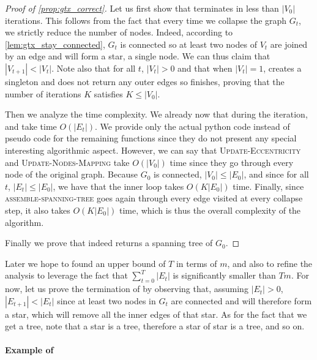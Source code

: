\begin{proof}[Proof of \autoref{prop:gtx_correct}]
  Let us first show that \gtx{} terminates in less than $|V_0|$ iterations. This follows from the
  fact that every time we collapse the graph $G_t$, we strictly reduce the number of nodes. Indeed,
  according to \autoref{lem:gtx_stay_connected}, $G_t$ is connected so at least two nodes of $V_t$
  are joined by an edge and will form a star, \ie{} a single node. We can thus claim that $|V_{t+1}| <
  |V_t|$. Note also that for all $t$, $|V_t| > 0$ and that when $|V_t|=1$, \extractStar{} creates a
  singleton and \collapseStar{} does not return any outer edges so \gtx{} finishes, proving that the
  number of iterations $K$ satisfies $K \leq |V_0|$.

 Then we analyze the time complexity. We already now that during the \tth{} iteration,
 \extractStar{} and \collapseStar{} take time $O(|E_t|)$. We provide only the actual python code
 instead of pseudo code for the remaining functions since they do not present any special
 interesting algorithmic aspect. However, we can say that \textsc{Update-Eccentricity} and
 \textsc{Update-Nodes-Mapping} take $O(|V_0|)$ time since they go through every node of the original
 graph. Because $G_0$ is connected, $|V_0| \leq |E_0|$, and since for all $t$, $|E_t| \leq |E_0|$,
 we have that the \gtx{} inner loop takes $O(K|E_0|)$ time. Finally, since
 \textsc{assemble-spanning-tree} goes again through every edge visited at every collapse step, it
 also takes $O(K|E_0|)$ time, which is thus the overall complexity of the \gtx{} algorithm.

  Finally we prove that \gtx{} indeed returns a spanning tree of $G_0$.
\end{proof}


Later we hope to found an upper bound of $T$ in terms of $m$, and also to refine the analysis to
leverage the fact that $\sum_{t=0}^T |E_t|$ is significantly smaller than $Tm$. For now, let us
prove the termination of \gtx{} by observing that, assuming $|E_t|>0$, $|E_{t+1}| < |E_t|$ since
at least two nodes in $G_t$ are connected and will therefore form a star, which will remove all the
inner edges of that star. As for the fact that we get a tree, note that a star is a tree, therefore
a star of star is a tree, and so on.

\paragraph{Example of \gtx{}}
\label{par:exemple_of_gtx}

